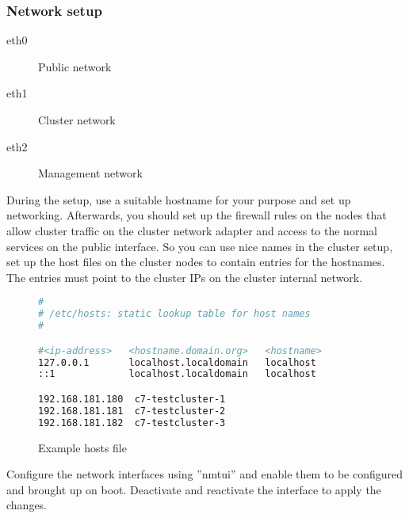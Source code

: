 \subsubsection{Network setup}
\begin{description}
\item[eth0] Public network
\item[eth1] Cluster network
\item[eth2] Management network
\end{description}
During the setup, use a suitable hostname for your purpose and set up networking.
Afterwards, you should set up the firewall rules on the nodes that allow cluster traffic
on the cluster network adapter and access to the normal services on the public interface.
So you can use nice names in the cluster setup, set up the host files on the cluster
nodes to contain entries for the hostnames. The entries must point to the cluster IPs
on the cluster internal network.
\begin{figure}
\begin{lstlisting}[language=sh]
#
# /etc/hosts: static lookup table for host names
#

#<ip-address>   <hostname.domain.org>   <hostname>
127.0.0.1       localhost.localdomain   localhost
::1             localhost.localdomain   localhost

192.168.181.180  c7-testcluster-1
192.168.181.181  c7-testcluster-2
192.168.181.182  c7-testcluster-3
\end{lstlisting}
\caption{Example hosts file}
\end{figure}
Configure the network interfaces using ''nmtui'' and enable them to be configured
and brought up on boot. Deactivate and reactivate the interface to apply the changes.

